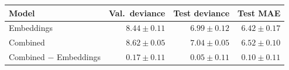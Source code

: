\begin{tabular}{lrrr}
\toprule
Model & Val.\ deviance & Test deviance & Test MAE \\
\midrule
Embeddings & $8.44 \pm 0.11$ & $6.99 \pm 0.12$ & $6.42 \pm 0.17$ \\
Combined & $8.62 \pm 0.05$ & $7.04 \pm 0.05$ & $6.52 \pm 0.10$ \\
Combined $-$ Embeddings & $0.17 \pm 0.11$ & $0.05 \pm 0.11$ & $0.10 \pm 0.11$ \\
\bottomrule
\end{tabular}
